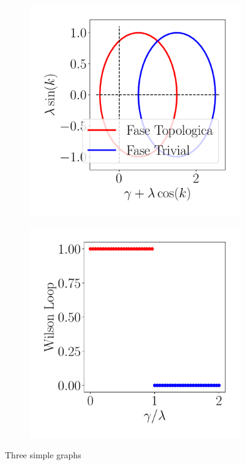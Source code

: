 \begin{figure}[h!]
\begin{subfigure}[b!]{0.27 \textwidth}
         \label{}
     \end{subfigure}\hspace*{-0.9em}
     \begin{subfigure}[b!]{0.27 \textwidth}
         \caption{}
         \includegraphics[width=\textwidth]{Imagenes/Shh_images/loop_shh.pdf}
         \label{}
     \end{subfigure}\hspace*{-0.9em}
     \begin{subfigure}[b!]{0.27 \textwidth}
         \caption{}
         \includegraphics[width=\textwidth]{Imagenes/Shh_images/winding_shh.pdf}
         \label{}
     \end{subfigure}
        \caption{Three simple graphs}
        \label{fig:three graphs}
\end{figure}

